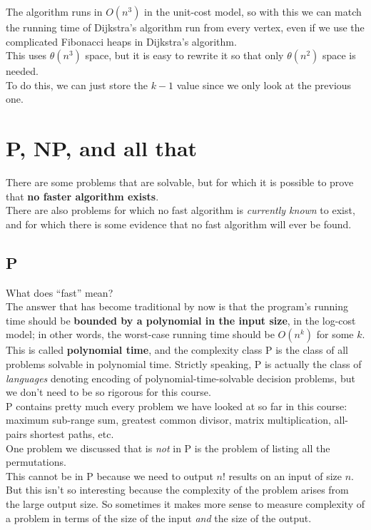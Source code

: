 \documentclass[12pt]{article}
\theoremstyle{plain}
\theoremstyle{definition}
\begin{document}
The algorithm runs in $O(n^{3})$ in the unit-cost model, so with this we can match the running time of Dijkstra's algorithm run from every vertex, even if we use the complicated Fibonacci heaps in Dijkstra's algorithm. \\

This uses $\theta(n^{3})$ space, but it is easy to rewrite it so that only $\theta(n^{2})$ space is needed. \\
To do this, we can just store the $k-1$ value since we only look at the previous one.

\newpage
\section{P, NP, and all that}
There are some problems that are solvable, but for which it is possible to prove that \textbf{no faster algorithm exists}. \\
There are also problems for which no fast algorithm is \emph{currently known} to exist, and for which there is some evidence that no fast algorithm will ever be found. \\

\subsection{P}
What does ``fast'' mean? \\
The answer that has become traditional by now is that the program's running time should be \textbf{bounded by a polynomial in the input size}, in the log-cost model;
in other words, the worst-case running time should be $O(n^{k})$ for some $k$. \\
This is called \textbf{polynomial time}, and the complexity class P is the class of all problems solvable in polynomial time.
Strictly speaking, P is actually the class of \emph{languages} denoting encoding of polynomial-time-solvable decision problems, but we don't need to be so rigorous for this course. \\

P contains pretty much every problem we have looked at so far in this course: maximum sub-range sum, greatest common divisor, matrix multiplication, all-pairs shortest paths, etc. \\

One problem we discussed that is \emph{not} in P is the problem of listing all the permutations. \\
This cannot be in P because we need to output $n!$ results on an input of size $n$. \\
But this isn't so interesting because the complexity of the problem arises from the large output size.
So sometimes it makes more sense to measure complexity of a problem in terms of the size of the input \emph{and} the size of the output. \\
\end{document}
